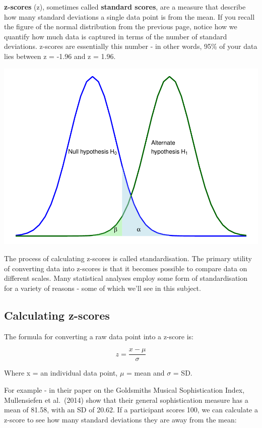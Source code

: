 \documentclass[
]{book}
\begin{document}
\textbf{z-scores} (z), sometimes called \textbf{standard scores}, are a measure that describe how many standard deviations a single data point is from the mean. If you recall the figure of the normal distribution from the previous page, notice how we quantify how much data is captured in terms of the number of standard deviations. z-scores are essentially this number - in other words, 95\% of your data lies between z = -1.96 and z = 1.96.

\includegraphics{_main_files/figure-latex/unnamed-chunk-85-1.pdf}

The process of calculating z-scores is called standardisation. The primary utility of converting data into z-scores is that it becomes possible to compare data on different scales. Many statistical analyses employ some form of standardisation for a variety of reasons - some of which we'll see in this subject.

\subsection{Calculating z-scores}\label{calculating-z-scores}

The formula for converting a raw data point into a z-score is:

\[
z = \frac{x - \mu}{\sigma}
\]

Where x = an individual data point, \(\mu\) = mean and \(\sigma\) = SD.

For example - in their paper on the Goldsmiths Musical Sophistication Index, Mullensiefen et al.~(2014) show that their general sophistication measure has a mean of 81.58, with an SD of 20.62. If a participant scores 100, we can calculate a z-score to see how many standard deviations they are away from the mean:
\end{document}
